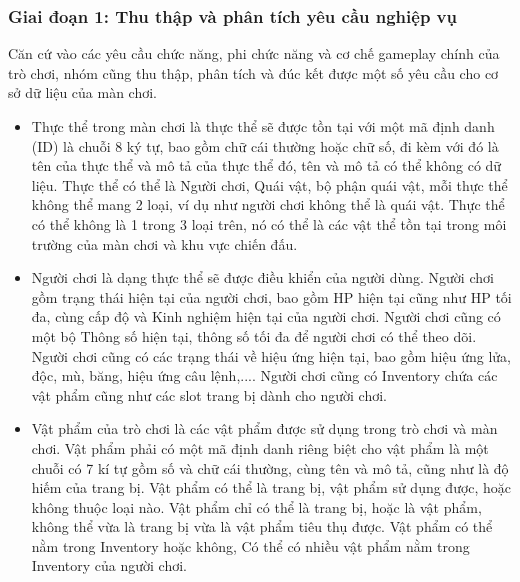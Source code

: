 \subsubsection{Giai đoạn 1: Thu thập và phân tích yêu cầu nghiệp vụ}
\hspace*{0.5cm} Căn cứ vào các yêu cầu chức năng, phi chức năng và cơ chế gameplay chính của trò chơi, nhóm cũng thu thập, phân tích và đúc kết được một số yêu cầu cho cơ sở dữ liệu của màn chơi.
\begin{itemize}
	\item Thực thể trong màn chơi là thực thể sẽ được tồn tại với một mã định danh (ID) là chuỗi 8 ký tự, bao gồm chữ cái thường hoặc chữ số, đi kèm với đó là tên của thực thể và mô tả của thực thể đó, tên và mô tả có thể không có dữ liệu. Thực thể có thể là Người chơi, Quái vật, bộ phận quái vật, mỗi thực thể không thể mang 2 loại, ví dụ như người chơi không thể là quái vật. Thực thể có thể không là 1 trong 3 loại trên, nó có thể là các vật thể tồn tại trong môi trường của màn chơi và khu vực chiến đấu.
	\item Người chơi là dạng thực thể sẽ được điều khiển của người dùng. Người chơi gồm trạng thái hiện tại của người chơi, bao gồm HP hiện tại cũng như HP tối đa, cùng cấp độ và Kinh nghiệm hiện tại của người chơi. Người chơi cũng có một bộ Thông số hiện tại, thông số tối đa để người chơi có thể theo dõi. Người chơi cũng có các trạng thái về hiệu ứng hiện tại, bao gồm hiệu ứng lửa, độc, mù, băng, hiệu ứng câu lệnh,.... Người chơi cũng có Inventory chứa các vật phẩm cũng như các slot trang bị dành cho người chơi.
	\item Vật phẩm của trò chơi là các vật phẩm được sử dụng trong trò chơi và màn chơi. Vật phẩm phải có một mã định danh riêng biệt cho vật phẩm là một chuỗi có 7 kí tự gồm số và chữ cái thường, cùng tên và mô tả, cũng như là độ hiếm của trang bị. Vật phẩm có thể là trang bị, vật phẩm sử dụng được, hoặc không thuộc loại nào. Vật phẩm chỉ có thể là trang bị, hoặc là vật phẩm, không thể vừa là trang bị vừa là vật phẩm tiêu thụ được. Vật phẩm có thể nằm trong Inventory hoặc không, Có thể có nhiều vật phẩm nằm trong Inventory của người chơi.

\end{itemize}
